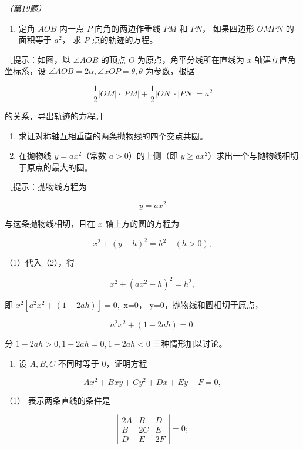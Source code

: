 \emph{（第19题）}

\begin{enumerate}
\def\labelenumi{\arabic{enumi}.}
\setcounter{enumi}{18}
\tightlist
\item
  定角 \(AOB\) 内一点 \(P\) 向角的两边作垂线 \(PM\) 和 \(PN\)，
  如果四边形 \(OMPN\) 的面积等于 \(a^2\)， 求 \(P\) 点的轨迹的方程。
\end{enumerate}

［提示：如图，以 \(\angle AOB\) 的顶点 \(O\) 为原点，角平分线所在直线为
\(x\) 轴建立直角坐标系，设
\(\angle AOB = 2\alpha, \angle xOP = \theta, \theta\) 为参数，根据

\[
\frac {1}{2} | OM | \cdot | PM | + \frac {1}{2} | ON | \cdot | PN | = a^{2}
\]

的关系，导出轨迹的方程。］

\begin{enumerate}
\def\labelenumi{\arabic{enumi}.}
\setcounter{enumi}{19}
\item
  求证对称轴互相垂直的两条抛物线的四个交点共圆。
\item
  在抛物线 \(y = ax^2\)（常数 \(a > 0\)）的上侧（即
  \(y \geqslant ax^2\)）求出一个与抛物线相切于原点的最大的圆。
\end{enumerate}

［提示：抛物线方程为

\[
y = a x^{2} \tag {1}
\]

与这条抛物线相切，且在 \(x\) 轴上方的圆的方程为

\[
x^{2} + (y - h) ^ {2} = h^{2} \quad (h > 0), \tag {2}
\]

（1）代入（2），得

\[
x^{2} + (a x^{2} - h) ^ {2} = h^{2},
\]

即 \(x^{2}[a^{2}x^{2} + (1 - 2ah)] = 0,\) x=0，
y=0，抛物线和圆相切于原点，

\[
a^{2} x^{2} + (1 - 2 a h) = 0.
\]

分 \(1 - 2ah > 0, 1 - 2ah = 0, 1 - 2ah < 0\) 三种情形加以讨论。

\begin{enumerate}
\def\labelenumi{\arabic{enumi}.}
\setcounter{enumi}{21}
\tightlist
\item
  设 \(A, B, C\) 不同时等于 0，证明方程
\end{enumerate}

\[
A x^{2} + B x y + C y^{2} + D x + E y + F = 0,
\]

（1） 表示两条直线的条件是

\[
\left| \begin{array}{ccc} 2 A & B & D \\ B & 2 C & E \\ D & E & 2 F \end{array} \right| = 0;
\]

